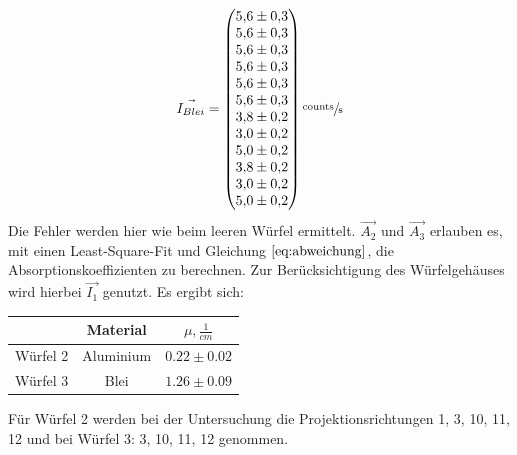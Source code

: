 \begin{equation}
	\vec{I_{Blei}}=
	\begin{pmatrix}
		\num{5.6 \pm 0.3} \\
		\num{5.6 \pm 0.3} \\
		\num{5.6\pm 0.3} \\
		\num{5.6\pm 0.3} \\
		\num{5.6\pm 0.3} \\
		\num{5.6\pm 0.3} \\
		\num{3.8\pm 0.2} \\
		\num{3.0\pm 0.2} \\
		\num{5.0\pm 0.2} \\
    \num{3.8\pm 0.2 } \\
    \num{3.0\pm 0.2} \\
    \num{5.0\pm 0.2} \\
	\end{pmatrix}
    \sfrac{\text{counts}}{\text{s}}
	\label{eq:vecleer1}
\end{equation}
Die Fehler werden hier wie beim leeren Würfel ermittelt.
$\vec{A_2}$ und $\vec{A_3}$ erlauben es, mit einen Least-Square-Fit und Gleichung $\ref{eq:abweichung}$, die Absorptionskoeffizienten zu berechnen.
Zur Berücksichtigung des Würfelgehäuses wird hierbei $\vec{I_1}$ genutzt.
\clearpage
Es ergibt sich:
\begin{table}[H]
  \centering
\begin{tabular}{c|c|c}
  & Material &  $\mu,\frac{1}{\si{cm}}$ \\
  \hline
Würfel 2 & Aluminium & $0.22 \pm 0.02$ \\
Würfel 3 & Blei      & $1.26 \pm 0.09$
\end{tabular}
\end{table}
Für Würfel 2 werden bei der Untersuchung die Projektionsrichtungen 1, 3, 10, 11, 12 und bei Würfel 3: 3, 10, 11, 12 genommen.
